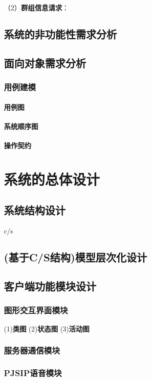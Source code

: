 \documentclass[a4paper,AutoFakeBold,oneside,12pt]{book}
\begin{document}
（2）\textbf{群组信息请求}：
 
\section{系统的非功能性需求分析}
\section{面向对象需求分析}
\subsection{用例建模}
\subsubsection{用例图}
\subsubsection{系统顺序图}
\subsubsection{操作契约}

\newpage
\chapter{系统的总体设计}
\section{系统结构设计}
c/s
\section{(基于C/S结构)模型层次化设计}
\section{客户端功能模块设计}
\subsection{图形交互界面模块}
(1)\textbf{类图}
(2)\textbf{状态图}
(3)\textbf{活动图}
\subsection{服务器通信模块}
\subsection{PJSIP语音模块}
\end{document}
